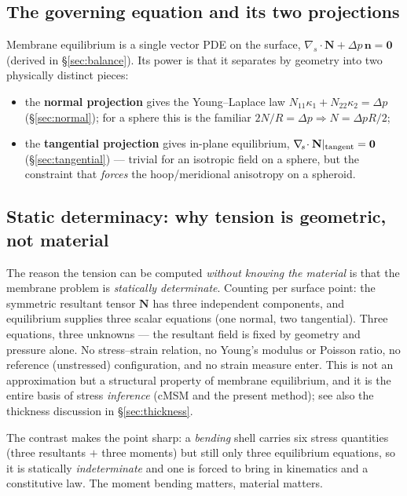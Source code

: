 \documentclass[11pt]{article}
\newcommand{\vv}[1]{\bm{#1}}          %
\newcommand{\nn}{\vv{n}}               %
\newcommand{\Nb}{\mathbf{N}}           %
\newcommand{\kone}{\kappa_1}
\newcommand{\ktwo}{\kappa_2}
\newcommand{\divs}{\nabla_{\!s}\!\cdot}
\begin{document}
\subsection{The governing equation and its two projections}

Membrane equilibrium is a single vector PDE on the surface,
$\divs\Nb+\Delta p\,\nn=\vv0$ (derived in \S\ref{sec:balance}).  Its power is
that it separates by geometry into two physically distinct pieces:
\begin{itemize}[nosep]
  \item the \textbf{normal projection} gives the Young--Laplace law
        $N_{11}\kone+N_{22}\ktwo=\Delta p$ (\S\ref{sec:normal}); for a sphere
        this is the familiar $2N/R=\Delta p\Rightarrow N=\Delta p R/2$;
  \item the \textbf{tangential projection} gives in-plane equilibrium,
        $\divs\Nb|_{\rm tangent}=\vv0$ (\S\ref{sec:tangential}) — trivial for an
        isotropic field on a sphere, but the constraint that \emph{forces} the
        hoop/meridional anisotropy on a spheroid.
\end{itemize}

\subsection{Static determinacy: why tension is geometric, not material}
\label{sec:el-determinacy}

The reason the tension can be computed \emph{without knowing the material} is
that the membrane problem is \emph{statically determinate}.  Counting per
surface point: the symmetric resultant tensor $\Nb$ has three independent
components, and equilibrium supplies three scalar equations (one normal, two
tangential).  Three equations, three unknowns — the resultant field is fixed by
geometry and pressure alone.  No stress--strain relation, no Young's modulus or
Poisson ratio, no reference (unstressed) configuration, and no strain measure
enter.  This is not an approximation but a structural property of membrane
equilibrium, and it is the entire basis of stress \emph{inference} (cMSM and the
present method); see also the thickness discussion in \S\ref{sec:thickness}.

The contrast makes the point sharp: a \emph{bending} shell carries six stress
quantities (three resultants $+$ three moments) but still only three equilibrium
equations, so it is statically \emph{indeterminate} and one is forced to bring in
kinematics and a constitutive law.  The moment bending matters, material matters.
\end{document}
